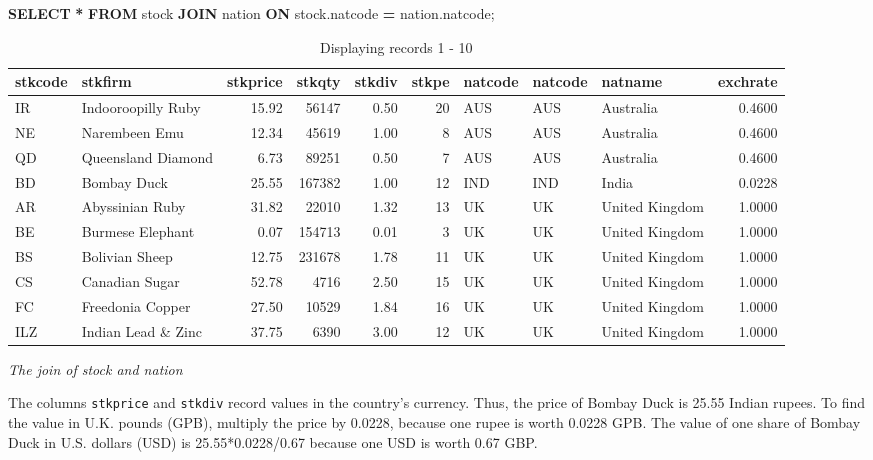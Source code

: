 \documentclass[
]{article}
\newenvironment{Shaded}{\begin{snugshade}}{\end{snugshade}}
\newcommand{\KeywordTok}[1]{\textcolor[rgb]{0.13,0.29,0.53}{\textbf{#1}}}
\newcommand{\NormalTok}[1]{#1}
\newcommand{\OperatorTok}[1]{\textcolor[rgb]{0.81,0.36,0.00}{\textbf{#1}}}
\begin{document}
\begin{Shaded}
\begin{Highlighting}[]
\KeywordTok{SELECT} \OperatorTok{*} \KeywordTok{FROM}\NormalTok{ stock }\KeywordTok{JOIN}\NormalTok{ nation}
    \KeywordTok{ON}\NormalTok{ stock.natcode }\OperatorTok{=}\NormalTok{ nation.natcode;}
\end{Highlighting}
\end{Shaded}

\begin{table}

\caption{\label{tab:unnamed-chunk-40}Displaying records 1 - 10}
\centering
\begin{tabular}[t]{l|l|r|r|r|r|l|l|l|r}
\hline
stkcode & stkfirm & stkprice & stkqty & stkdiv & stkpe & natcode & natcode & natname & exchrate\\
\hline
IR & Indooroopilly Ruby & 15.92 & 56147 & 0.50 & 20 & AUS & AUS & Australia & 0.4600\\
\hline
NE & Narembeen Emu & 12.34 & 45619 & 1.00 & 8 & AUS & AUS & Australia & 0.4600\\
\hline
QD & Queensland Diamond & 6.73 & 89251 & 0.50 & 7 & AUS & AUS & Australia & 0.4600\\
\hline
BD & Bombay Duck & 25.55 & 167382 & 1.00 & 12 & IND & IND & India & 0.0228\\
\hline
AR & Abyssinian Ruby & 31.82 & 22010 & 1.32 & 13 & UK & UK & United Kingdom & 1.0000\\
\hline
BE & Burmese Elephant & 0.07 & 154713 & 0.01 & 3 & UK & UK & United Kingdom & 1.0000\\
\hline
BS & Bolivian Sheep & 12.75 & 231678 & 1.78 & 11 & UK & UK & United Kingdom & 1.0000\\
\hline
CS & Canadian Sugar & 52.78 & 4716 & 2.50 & 15 & UK & UK & United Kingdom & 1.0000\\
\hline
FC & Freedonia Copper & 27.50 & 10529 & 1.84 & 16 & UK & UK & United Kingdom & 1.0000\\
\hline
ILZ & Indian Lead \& Zinc & 37.75 & 6390 & 3.00 & 12 & UK & UK & United Kingdom & 1.0000\\
\hline
\end{tabular}
\end{table}

\emph{The join of stock and nation}

The columns \texttt{stkprice} and \texttt{stkdiv} record values in the country's
currency. Thus, the price of Bombay Duck is 25.55 Indian rupees. To find
the value in U.K. pounds (GPB), multiply the price by 0.0228, because
one rupee is worth 0.0228 GPB. The value of one share of Bombay Duck in
U.S. dollars (USD) is 25.55*0.0228/0.67 because one USD is worth 0.67
GBP.
\end{document}
